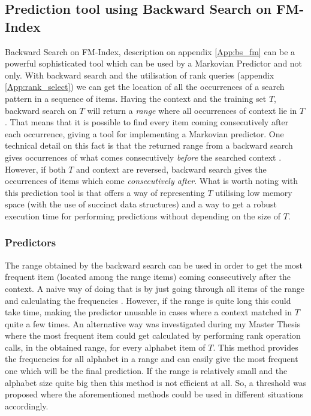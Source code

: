 \subsection{Prediction tool using Backward Search on FM-Index}{\label{PTonBSFM}}
Backward Search on FM-Index, description on appendix \ref{App:bs_fm} can be a powerful sophisticated tool which can be used by a Markovian Predictor and not only. With backward search and the utilisation of rank queries (appendix \ref{App:rank_select}) we can get the location of all the occurrences of a search pattern in a sequence of items. Having the context and the training set $T$, backward search on $T$ will return a \emph{range} where all occurrences of context lie in $T$. That means that it is possible to find every item coming consecutively after each occurrence, giving a tool for implementing a Markovian predictor. One technical detail on this fact is that the returned range from a backward search gives occurrences of what comes consecutively \emph{before} the searched context \cite{ktistakis}. However, if both $T$ and context are reversed, backward search gives the occurrences of items which come \emph{consecutively after}. What is worth noting with this prediction tool is that offers a way of representing $T$ utilising low memory space (with the use of succinct data structures) and a way to get a robust execution time for performing predictions without depending on the size of $T$.
 
\subsubsection{Predictors}{\label{Prs}}
The range obtained by the backward search can be used in order to get the most frequent item (located among the range items) coming consecutively after the context. A naive way of doing that is by just going through all items of the range and calculating the frequencies \cite{ktistakis}. However, if the range is quite long this could take time, making the predictor unusable in cases where a context matched in $T$ quite a few times. An alternative way was investigated during my Master Thesis where the most frequent item could get calculated by performing rank operation calls, in the obtained range, for every alphabet item of $T$. This method provides the frequencies for all alphabet in a range and can easily give the most frequent one which will be the final prediction. If the range is relatively small and the alphabet size quite big then this method is not efficient at all. So, a threshold was proposed \cite{ktistakis} where the aforementioned methods could be used in different situations accordingly.


